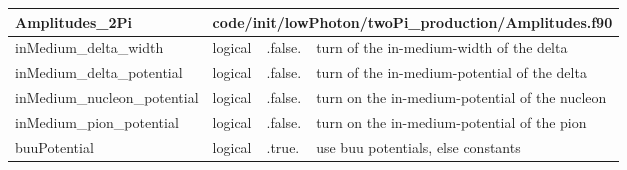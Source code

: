 \documentclass{article}
\begin{document}

\begin{longtable}{llll}
\toprule
\textbf{\large{Amplitudes\_2Pi}} & \multicolumn{3}{l}{\footnotesize{code/init/lowPhoton/twoPi\_production/Amplitudes.f90}}\\*
\midrule
\endfirsthead
\midrule
\endhead
inMedium\_delta\_width & \begin{minipage}[t]{2cm}logical\end{minipage} & \begin{minipage}[t]{2cm}.false.\end{minipage} & \begin{minipage}[t]{12cm}turn of the in-medium-width of the delta\end{minipage}\\*
\midrule
inMedium\_delta\_potential & \begin{minipage}[t]{2cm}logical\end{minipage} & \begin{minipage}[t]{2cm}.false.\end{minipage} & \begin{minipage}[t]{12cm}turn of the in-medium-potential of the delta\end{minipage}\\*
\midrule
inMedium\_nucleon\_potential & \begin{minipage}[t]{2cm}logical\end{minipage} & \begin{minipage}[t]{2cm}.false.\end{minipage} & \begin{minipage}[t]{12cm}turn on the in-medium-potential of the nucleon\end{minipage}\\*
\midrule
inMedium\_pion\_potential & \begin{minipage}[t]{2cm}logical\end{minipage} & \begin{minipage}[t]{2cm}.false.\end{minipage} & \begin{minipage}[t]{12cm}turn on the in-medium-potential of the pion\end{minipage}\\*
\midrule
buuPotential & \begin{minipage}[t]{2cm}logical\end{minipage} & \begin{minipage}[t]{2cm}.true.\end{minipage} & \begin{minipage}[t]{12cm}use buu potentials, else constants\end{minipage}\\*
\bottomrule
\end{longtable}
{ }
\end{document}

